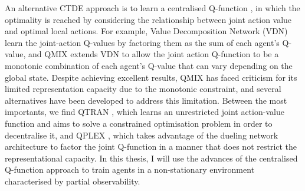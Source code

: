 \documentclass[a4paper,singleside,12pt]{report} %
\begin{document}
An alternative CTDE approach is to learn a centralised Q-function \cite{AAMAS2018VDN, Rashid2018QMIXMV, Son2019QTRANLT, Yang2020QattenAG, Wang2020QPLEXDD}, in which the optimality is reached by considering the relationship between joint action value and optimal local actions. For example, Value Decomposition Network (VDN) \cite{AAMAS2018VDN} learn the joint-action Q-values by factoring them as the sum of each agent's Q-value, and QMIX \cite{Rashid2018QMIXMV} extends VDN to allow the joint action Q-function to be a monotonic combination of each agent's Q-value that can vary depending on the global state. Despite achieving excellent results, QMIX has faced criticism for its limited representation capacity due to the monotonic constraint, and several alternatives have been developed to address this limitation. Between the most importants, we find QTRAN \cite{Son2019QTRANLT}, which learns an unrestricted joint action-value function and aims to solve a constrained optimisation problem in order to decentralise it, and QPLEX \cite{Wang2020QPLEXDD}, which takes advantage of the dueling network architecture to factor the joint Q-function in a manner that does not restrict the representational capacity. In this thesis, I will use the advances of the centralised Q-function approach to train agents in a non-stationary environment characterised by partial observability.
\end{document}
